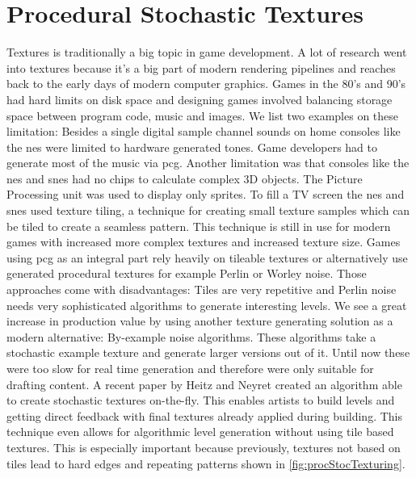\documentclass[10pt,a4paper]{article}
\begin{document}
\section{Procedural Stochastic Textures}
\begin{multicols}{2}
Textures is traditionally a big topic in game development. A lot of research went into textures because it’s a big part of modern rendering pipelines and reaches back to the early days of modern computer graphics. Games in the 80’s and 90’s had hard limits on disk space\cite{Ferrari2016} and designing games involved balancing storage space between program code, music and images. We list two examples on these limitation: Besides a single digital sample channel sounds on home consoles like the \gls{nes} were limited to hardware generated tones\cite{wiki:NintendoEntertainmentSystem}. Game developers had to generate most of the music via \gls{pcg}. Another limitation was that consoles like the \gls{nes} and \gls{snes} had no chips to calculate complex 3D objects. The Picture Processing unit was used to display only sprites. To fill a TV screen the \gls{nes} and \gls{snes} used texture tiling, a technique for creating small texture samples which can be tiled to create a seamless pattern. This technique is still in use for modern games with increased more complex textures and increased texture size. Games using \gls{pcg} as an integral part rely heavily on tileable textures or alternatively use generated procedural textures for example Perlin\cite{perlin1985image} or Worley\cite{worley1996cellular} noise. Those approaches come with disadvantages: Tiles are very repetitive and Perlin noise needs very sophisticated algorithms to generate interesting levels. We see a great increase in production value by using another texture generating solution as a modern alternative: By-example noise algorithms. These algorithms take a stochastic example texture and generate larger versions out of it. Until now these were too slow for real time generation and therefore were only suitable for drafting content. A recent paper by Heitz and Neyret created an algorithm able to create stochastic textures on-the-fly\cite{Heitz2018}. This enables artists to build levels and getting direct feedback with final textures already applied during building. This technique even allows for algorithmic level generation without using tile based textures. This is especially important because previously, textures not based on tiles lead to hard edges and repeating patterns shown in \autoref{fig:procStocTexturing}.
\end{multicols}
\end{document}
